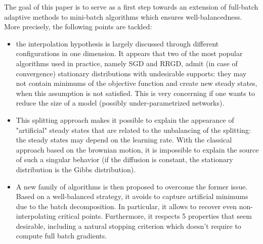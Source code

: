 \documentclass[article,authoryear,jmlmc]{beg_32}             %
\begin{document}
The goal of this paper is to serve as a first step towards an extension of full-batch adaptive methods \cite{Bilel} to mini-batch algorithms which ensures well-balancedness.
More precisely, the following points are tackled:
\begin{itemize}
	\item the interpolation hypothesis is largely discussed through different configurations in one dimension. It appears that two of the most popular algorithms used in practice, namely SGD and RRGD, admit (in case of convergence) stationary distributions with undesirable supports: they may not contain minimums of the objective function and create new steady states, when this assumption is not satisfied. This is very concerning if one wants to reduce the size of a model (possibly under-parametrized networks).
	\item 
          This
          splitting approach makes it possible to explain the appearance of "artificial" steady states that are related to the unbalancing of the splitting: the steady states may depend on the learning rate. With the classical approach based on the brownian motion, it is impossible to explain the source of such a singular behavior (if the diffusion is constant, the stationary distribution is the Gibbs distribution).
         \item A new family of algorithms is then proposed to overcome the former issue. Based on a well-balanced strategy, it avoids to capture artificial minimums due to the batch
           decomposition. In particular, it allows to recover even non-interpolating critical points. Furthermore, it respects 5 properties that seem desirable, including a natural stopping
           criterion which doesn't require to compute full batch gradients. 
\end{itemize}
\end{document}
